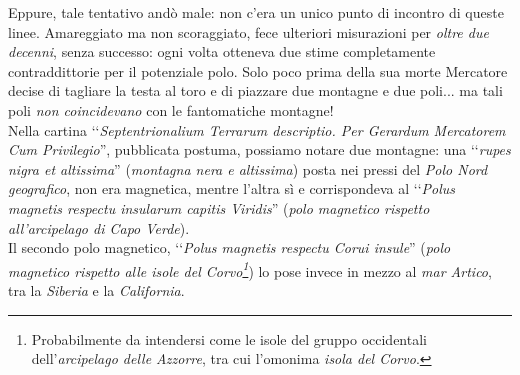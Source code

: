 \begin{digressionwt}
	Eppure, tale tentativo andò male: non c'era un unico punto di incontro di queste linee. Amareggiato ma non scoraggiato, fece ulteriori misurazioni per \textit{oltre due decenni}, senza successo: ogni volta otteneva due stime completamente contraddittorie per il potenziale polo. Solo poco prima della sua morte Mercatore decise di tagliare la testa al toro e di piazzare due montagne e due poli... ma tali poli \textit{non coincidevano} con le fantomatiche montagne!\newline~\\
	Nella cartina ‘‘\textit{Septentrionalium Terrarum descriptio. Per Gerardum Mercatorem Cum Privilegio}'',  pubblicata postuma, possiamo notare due montagne: una ‘‘\textit{rupes nigra et altissima}'' (\textit{montagna nera e altissima}) posta nei pressi del \textit{Polo Nord geografico}, non era magnetica, mentre l'altra sì e corrispondeva al ‘‘\textit{Polus magnetis respectu insularum capitis Viridis}'' (\textit{polo magnetico rispetto all'arcipelago di Capo Verde}).\\
	Il secondo polo magnetico, ‘‘\textit{Polus magnetis respectu Corui insule}'' (\textit{polo magnetico rispetto alle isole del Corvo\footnote{Probabilmente da intendersi come le isole del gruppo occidentali dell'\textit{arcipelago delle Azzorre}, tra cui l'omonima \textit{isola del Corvo}.}}) lo pose invece in mezzo al \textit{mar Artico}, tra la \textit{Siberia} e la \textit{California}.%
	\begin{center}
			\setlength{\fboxsep}{0pt}%
			\setlength{\fboxrule}{1pt}%

\end{center}
\end{digressionwt}
